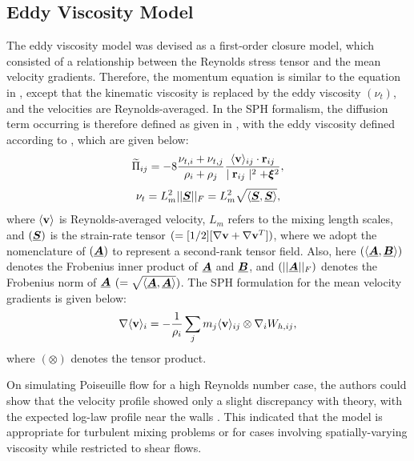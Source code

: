 \subsection{Eddy Viscosity Model}
\label{sec:eddy-visc-model}
The eddy viscosity model was devised as a first-order closure model, which consisted of a relationship between the Reynolds stress tensor and the mean velocity gradients. Therefore, the momentum equation is similar to the equation in , except that the kinematic viscosity is replaced by the eddy viscosity $(\nu_t)$, and the velocities are Reynolds-averaged. In the SPH formalism, the diffusion term occurring is therefore defined as given in , with the eddy viscosity defined according to , which are given below:
\begin{equation}
    \widetilde{\Pi}_{ij} = -8 \frac{\nu_{t, i} + \nu_{t, j}}{\rho_i + \rho_j} \frac{\langle \mathbf{v} \rangle_{ij} \cdot \mathbf{r}_{ij} }{\mid \mathbf{r}_{ij} \mid^{2} + \bm{\xi}^2},
    \label{eq:violeau-turbulent-diffusion-term}
\end{equation}
\begin{equation}
    \nu_t = L_m^2 ||\underline{\bm{S}}||_F = L_m^2 \sqrt{\langle \underline{\bm{S}}, \underline{\bm{S}} \rangle},
    \label{eq:violeau-eddy-viscosity}
\end{equation}
where $\langle \mathbf{v} \rangle$ is Reynolds-averaged velocity, $L_m$ refers to the mixing length scales, and $(\underline{\bm{S}})$ is the strain-rate tensor $(=[1/2][\nabla \mathbf{v} + \nabla \mathbf{v}^T])$, where we adopt the nomenclature of $(\underline{\bm{A}})$ to represent a second-rank tensor field. Also, here $(\langle \underline{\bm{A}}, \underline{\bm{B}} \rangle)$ denotes the Frobenius inner product of $\underline{\bm{A}}$ and $\underline{\bm{B}}$, and $(||\underline{\bm{A}}||_F)$ denotes the Frobenius norm of $\underline{\bm{A}}$ $( = \sqrt{\langle \underline{\bm{A}}, \underline{\bm{A}} \rangle})$.
The SPH formulation for the mean velocity gradients is given below:
\begin{equation}
    \nabla \langle \mathbf{v} \rangle_i = - \frac{1}{\rho_i} \sum_j m_j \langle \mathbf{v} \rangle_{ij} \otimes \nabla_{i} W_{h, ij},
    \label{eq:violeau-mean-velocity-gradient}
\end{equation}
where $(\otimes)$ denotes the tensor product.

On simulating Poiseuille flow for a high Reynolds number case, the authors could show that the velocity profile showed only a slight discrepancy with theory, with the expected log-law profile near the walls . This indicated that the model is appropriate for turbulent mixing problems or for cases involving spatially-varying viscosity while restricted to shear flows.

